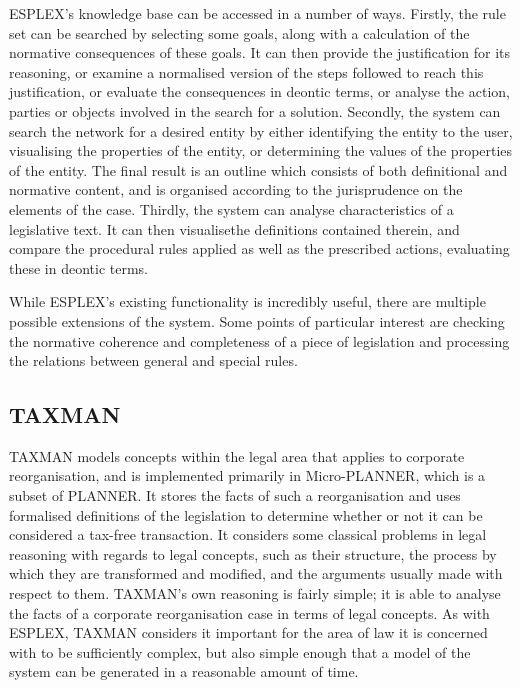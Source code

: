 \documentclass{l4proj}
\begin{document}
ESPLEX's knowledge base can be accessed in a number of ways. Firstly, the rule set can be searched by selecting some goals, along with a calculation of the normative consequences of these goals. It can then provide the justification for its reasoning, or examine a normalised version of the steps followed to reach this justification, or evaluate the consequences in deontic terms, or analyse the action, parties or objects involved in the search for a solution. Secondly, the system can search the network for a desired entity by either identifying the entity to the user, visualising the properties of the entity, or determining the values of the properties of the entity. The final result is an outline which consists of both definitional and normative content, and is organised according to the jurisprudence on the elements of the case. Thirdly, the system can analyse characteristics of a legislative text. It can then visualisethe definitions contained therein, and compare the procedural rules applied as well as the prescribed actions, evaluating these in deontic terms. 

While ESPLEX's existing functionality is incredibly useful, there are multiple possible extensions of the system. Some points of particular interest are checking the normative coherence and completeness of a piece of legislation and processing the relations between general and special rules. %


\subsection{TAXMAN}
TAXMAN models concepts within the legal area that applies to corporate reorganisation\cite{TAXMAN}, and is implemented primarily in Micro-PLANNER, which is a subset of PLANNER. It stores the facts of such a reorganisation and uses formalised definitions of the legislation to determine whether or not it can be considered a tax-free transaction. It considers some classical problems in legal reasoning with regards to legal concepts, such as their structure, the process by which they are transformed and modified, and the arguments usually made with respect to them. TAXMAN's own reasoning is fairly simple; it is able to analyse the facts of a corporate reorganisation case in terms of legal concepts. As with ESPLEX, TAXMAN considers it important for the area of law it is concerned with to be sufficiently complex, but also simple enough that a model of the system can be generated in a reasonable amount of time. 
\end{document}
